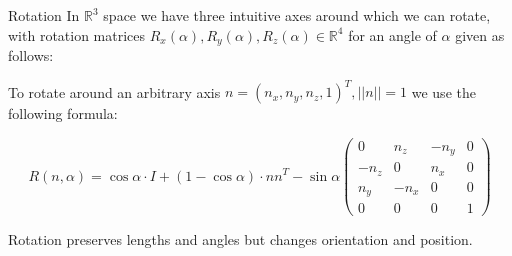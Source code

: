 \documentclass[english]{panikzettel}
\begin{document}
\begin{defi}{Rotation}
In $\mathbb{R}^3$ space we have three intuitive axes around which we can rotate, with rotation matrices \linebreak $R_x(\alpha), R_y(\alpha), R_z(\alpha) \in \mathbb{R}^4$ for an angle of $\alpha$ given as follows:



To rotate around an arbitrary axis $n = (n_x,n_y,n_z,1)^T, ||n|| = 1$ we use the following formula:

$$R(n,\alpha) = \cos \alpha \cdot I + (1 - \cos \alpha) \cdot nn^T - \sin \alpha \begin{pmatrix}
0 & n_z & -n_y & 0 \\ -n_z & 0 & n_x & 0 \\ n_y & -n_x & 0 & 0 \\ 0 & 0 & 0 & 1
\end{pmatrix}$$
\end{defi}

Rotation preserves lengths and angles but changes orientation and position.
\end{document}
